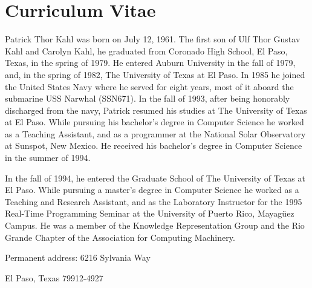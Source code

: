 
\chapter{Curriculum Vitae}

Patrick Thor Kahl was born on July 12, 1961. The first son of Ulf Thor Gustav 
Kahl and Carolyn Kahl, he graduated from Coronado High School, El Paso, Texas, 
in the spring of 1979.  He entered Auburn University in the fall of 1979, and,
in the spring of 1982, The University of Texas at El Paso.  In 1985 he joined
the United States Navy where he served for eight years, most of it aboard the
submarine USS Narwhal (SSN671).  In the fall of 1993, after being honorably
discharged from the navy, Patrick resumed his studies at The University of
Texas at El Paso.  While pursuing his bachelor's degree in Computer Science he
worked as a Teaching Assistant, and as a programmer at the National
Solar Observatory at Sunspot, New Mexico.  He received his bachelor's degree
in Computer Science in the summer of 1994.

In the fall of 1994, he entered the Graduate School of The University of Texas 
at El Paso.  While pursuing a master's degree in Computer Science he worked as 
a Teaching and Research Assistant, and as the Laboratory Instructor for the
1995 Real-Time Programming Seminar at the University of Puerto Rico,
Mayag\"{u}ez Campus.  He was a member of the Knowledge Representation Group
and the Rio Grande Chapter of the Association for Computing Machinery.

\medskip

\noindent
Permanent address: 6216 Sylvania Way

\noindent
\hspace{1.42in}
El Paso, Texas 79912-4927

\vfill



